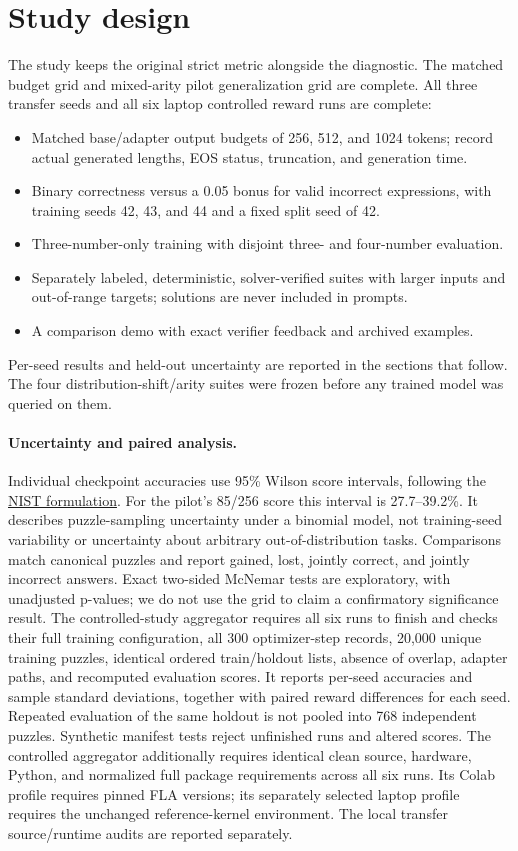 \documentclass[11pt]{article}
\begin{document}
\section{Study design}
The study keeps the original strict metric alongside the diagnostic. The matched
budget grid and mixed-arity pilot generalization grid are complete. All three
transfer seeds and all six laptop controlled reward runs are complete:
\begin{itemize}[nosep]
\item Matched base/adapter output budgets of 256, 512, and 1024 tokens; record actual
      generated lengths, EOS status, truncation, and generation time.
\item Binary correctness versus a 0.05 bonus for valid incorrect expressions,
      with training seeds 42, 43, and 44 and a fixed split seed of 42.
\item Three-number-only training with disjoint three- and four-number evaluation.
\item Separately labeled, deterministic, solver-verified suites with larger
      inputs and out-of-range targets; solutions are never included in prompts.
\item A comparison demo with exact verifier feedback and archived examples.
\end{itemize}
Per-seed results and held-out uncertainty are reported in the sections that
follow. The four distribution-shift/arity suites were frozen before any trained
model was queried on them.

\paragraph{Uncertainty and paired analysis.} Individual checkpoint accuracies use
95\% Wilson score intervals, following the
\href{https://www.itl.nist.gov/div898/handbook/prc/section2/prc241.htm}{NIST formulation}.
For the pilot's 85/256 score this interval is 27.7--39.2\%. It describes
puzzle-sampling uncertainty under a binomial model, not training-seed variability
or uncertainty about arbitrary out-of-distribution tasks. Comparisons match
canonical puzzles and report gained, lost, jointly correct, and jointly incorrect
answers. Exact two-sided McNemar tests are exploratory, with unadjusted p-values;
we do not use the grid to claim a confirmatory significance result.
The controlled-study aggregator requires all six runs to finish and checks
their full training configuration, all 300 optimizer-step records, 20,000 unique
training puzzles, identical ordered train/holdout lists, absence of overlap,
adapter paths, and recomputed evaluation scores. It reports per-seed accuracies
and sample standard deviations, together with paired reward differences for each
seed. Repeated evaluation of the same holdout is not pooled into 768 independent
puzzles. Synthetic manifest tests reject unfinished runs and altered scores.
The controlled aggregator additionally requires identical clean source, hardware,
Python, and normalized full package requirements across all six runs. Its Colab
profile requires pinned FLA versions; its separately selected laptop profile
requires the unchanged reference-kernel environment. The local transfer source/runtime audits are reported separately.
\end{document}
